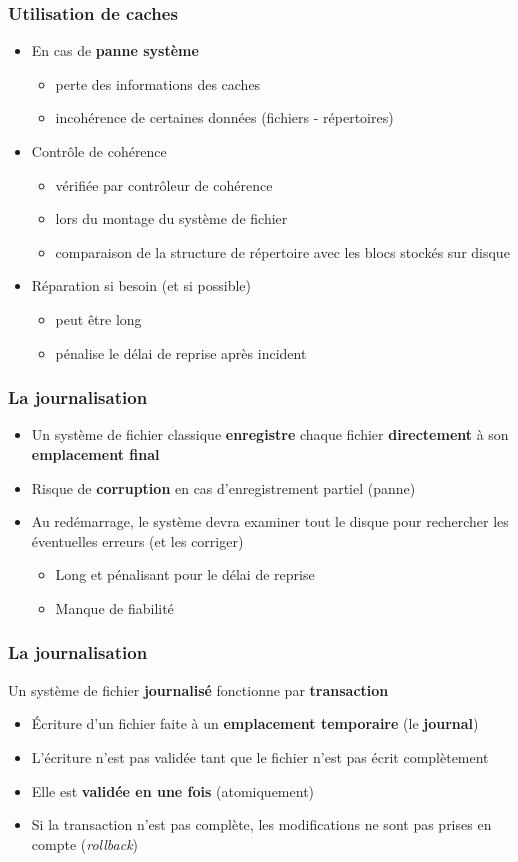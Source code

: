 \begin{frame}
\frametitle{Utilisation de caches}
\begin{itemize}
\item En cas de \textbf{panne système}
\begin{itemize}
\item perte des informations des caches
\item incohérence de certaines données (fichiers - répertoires)
\end{itemize}
\item Contrôle de cohérence
\begin{itemize}
\item vérifiée par contrôleur de cohérence
\item lors du montage du système de fichier
\item comparaison de la structure de répertoire avec les blocs stockés sur disque
\end{itemize}
\item Réparation si besoin (et si possible)
\begin{itemize}
\item peut être long
\item pénalise le délai de reprise après incident
\end{itemize}
\end{itemize}
\end{frame}

\begin{frame}
\frametitle{La journalisation}
\begin{itemize}
\item Un système de fichier classique \textbf{enregistre} chaque fichier \textbf{directement} à son \textbf{emplacement final}
\item Risque de \textbf{corruption} en cas d'enregistrement partiel (panne)
\item Au redémarrage, le système devra examiner tout le disque pour rechercher les éventuelles erreurs (et les corriger)
\begin{itemize}
\item Long et pénalisant pour le délai de reprise
\item Manque de fiabilité
\end{itemize}
\end{itemize}
\end{frame}

\begin{frame}
\frametitle{La journalisation}
Un système de fichier \textbf{journalisé} fonctionne par \textbf{transaction} 
\begin{itemize}
\item Écriture d'un fichier faite à un \textbf{emplacement temporaire} (le \textbf{journal})
\item L'écriture n'est pas validée tant que le fichier n'est pas écrit complètement
\item Elle est \textbf{validée en une fois} (atomiquement)
\item Si la transaction n'est pas complète, les modifications ne sont pas prises en compte (\textit{rollback})
\end{itemize}
\end{frame}

